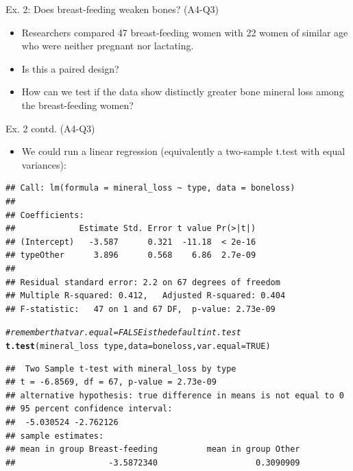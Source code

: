 \documentclass{beamer}\usepackage[]{graphicx}\usepackage[]{color}
\newcommand{\hlnum}[1]{\textcolor[rgb]{0.686,0.059,0.569}{#1}}%
\newcommand{\hlcom}[1]{\textcolor[rgb]{0.678,0.584,0.686}{\textit{#1}}}%
\newcommand{\hlopt}[1]{\textcolor[rgb]{0,0,0}{#1}}%
\newcommand{\hlstd}[1]{\textcolor[rgb]{0.345,0.345,0.345}{#1}}%
\newcommand{\hlkwc}[1]{\textcolor[rgb]{0.333,0.667,0.333}{#1}}%
\newcommand{\hlkwd}[1]{\textcolor[rgb]{0.737,0.353,0.396}{\textbf{#1}}}%
\newenvironment{knitrout}{}{} %
\begin{document}
\begin{frame}[fragile]{Ex. 2: Does breast-feeding weaken bones? (A4-Q3)}
\begin{minipage}{0.47\textwidth}
\begin{knitrout}
{}



\end{knitrout}
	
\end{minipage}
\begin{minipage}{0.5\textwidth}
	\pause 
	\begin{itemize}
		\small
		\setlength\itemsep{1em}
		\item  Researchers compared 47 breast-feeding women with 22 women of similar age who were neither pregnant nor lactating.
		\item Is this a paired design?
		\item How can we test if the data show distinctly greater bone mineral loss among the breast-feeding women?
	\end{itemize}
\end{minipage}

\end{frame}


\begin{frame}[fragile]{Ex. 2 contd. (A4-Q3)}
	\begin{itemize}
	\small
	\setlength\itemsep{1em}
	\item  We could run a linear regression (equivalently a two-sample t.test with equal variances):
\end{itemize}

\begin{knitrout}\tiny
{}\color{fgcolor}
\begin{verbatim}
## Call: lm(formula = mineral_loss ~ type, data = boneloss)
## 
## Coefficients:
##             Estimate Std. Error t value Pr(>|t|)
## (Intercept)   -3.587      0.321  -11.18  < 2e-16
## typeOther      3.896      0.568    6.86  2.7e-09
## 
## Residual standard error: 2.2 on 67 degrees of freedom
## Multiple R-squared: 0.412,	Adjusted R-squared: 0.404 
## F-statistic:   47 on 1 and 67 DF,  p-value: 2.73e-09
\end{verbatim}
\begin{alltt}
\hlcom{# remember that var.equal=FALSE is the default in t.test }
\hlkwd{t.test}\hlstd{(mineral_loss} \hlopt{~} \hlstd{type,} \hlkwc{data} \hlstd{= boneloss,} \hlkwc{var.equal} \hlstd{=} \hlnum{TRUE}\hlstd{)}
\end{alltt}
\begin{verbatim}
##  Two Sample t-test with mineral_loss by type 
## t = -6.8569, df = 67, p-value = 2.73e-09
## alternative hypothesis: true difference in means is not equal to 0 
## 95 percent confidence interval:
##  -5.030524 -2.762126 
## sample estimates:
## mean in group Breast-feeding          mean in group Other 
##                   -3.5872340                    0.3090909
\end{verbatim}

\end{knitrout}


\end{frame}
\end{document}
